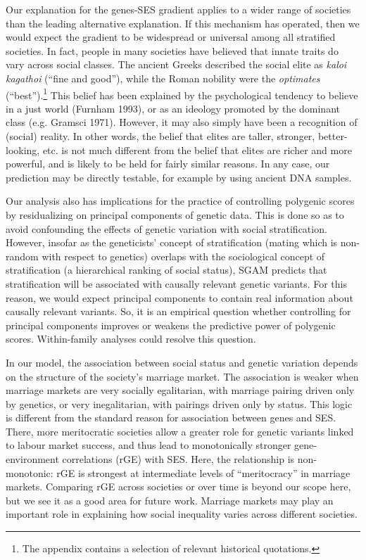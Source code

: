\documentclass[
]{article}
\begin{document}
Our explanation for the genes-SES gradient applies to a wider range of
societies than the leading alternative explanation. If this mechanism
has operated, then we would expect the gradient to be widespread or
universal among all stratified societies. In fact, people in many
societies have believed that innate traits do vary across social
classes. The ancient Greeks described the social elite as \emph{kaloi
kagathoi} (``fine and good''), while the Roman nobility were the
\emph{optimates} (``best'').\footnote{The appendix contains a selection of relevant historical
  quotations.} This belief has been explained by the
psychological tendency to believe in a just world (Furnham 1993), or
as an ideology promoted by the dominant class (e.g. Gramsci 1971). However, it may also simply have been a
recognition of (social) reality. In other words, the belief that elites
are taller, stronger, better-looking, etc. is not much different from
the belief that elites are richer and more powerful, and is likely to be
held for fairly similar reasons. In any case, our prediction may be
directly testable, for example by using ancient DNA samples.

Our analysis also has implications for the practice of controlling
polygenic scores by residualizing on principal components of genetic
data. This is done so as to avoid confounding the effects of genetic
variation with social stratification. However, insofar as the
geneticists' concept of stratification (mating which is non-random with
respect to genetics) overlaps with the sociological concept of
stratification (a hierarchical ranking of social status), SGAM predicts
that stratification will be associated with causally relevant genetic
variants. For this reason, we would expect principal components to
contain real information about causally relevant variants. So, it is an
empirical question whether controlling for principal components improves
or weakens the predictive power of polygenic scores. Within-family
analyses could resolve this question.

In our model, the association between social status and genetic
variation depends on the structure of the society's marriage market. The
association is weaker when marriage markets are very socially
egalitarian, with marriage pairing driven only by genetics, or very
inegalitarian, with pairings driven only by status. This logic is
different from the standard reason for association between genes and
SES. There, more meritocratic societies allow a greater role for genetic
variants linked to labour market success, and thus lead to monotonically
stronger gene-environment correlations (rGE) with SES. Here, the
relationship is non-monotonic: rGE is strongest at intermediate levels
of ``meritocracy'' in marriage markets. Comparing rGE across societies or
over time is beyond our scope here, but we see it as a good area for
future work. Marriage markets may play an important role in explaining
how social inequality varies across different societies.
\end{document}
